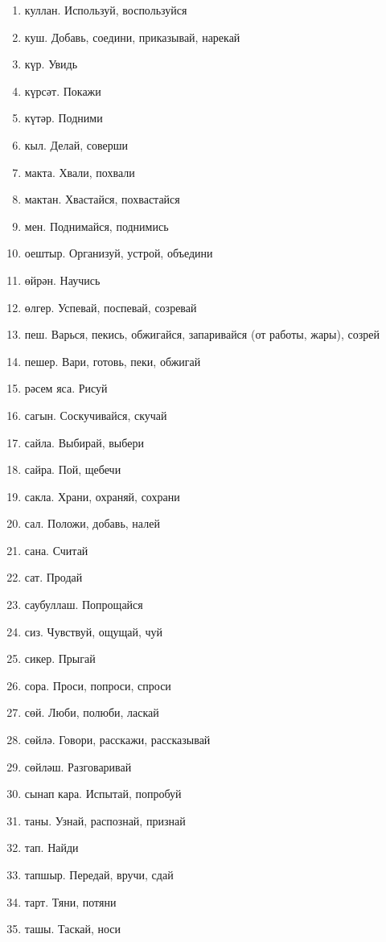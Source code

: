 \documentclass{article}
\begin{document}
\begin{enumerate}
    \item куллан. Используй, воспользуйся
    \item куш. Добавь, соедини, приказывай, нарекай
    \item күр. Увидь
    \item күрсәт. Покажи
    \item күтәр. Подними
    \item кыл. Делай, соверши
    \item макта. Хвали, похвали
    \item мактан. Хвастайся, похвастайся
    \item мен. Поднимайся, поднимись
    \item оештыр. Организуй, устрой, объедини
    \item өйрән. Научись
    \item өлгер. Успевай, поспевай, созревай
    \item пеш. Варься, пекись, обжигайся, запаривайся (от работы, жары), созрей
    \item пешер. Вари, готовь, пеки, обжигай
    \item рәсем яса. Рисуй
    \item сагын. Соскучивайся, скучай
    \item сайла. Выбирай, выбери
    \item сайра. Пой, щебечи
    \item сакла. Храни, охраняй, сохрани
    \item сал. Положи, добавь, налей
    \item сана. Считай
    \item сат. Продай
    \item саубуллаш. Попрощайся
    \item сиз. Чувствуй, ощущай, чуй
    \item сикер. Прыгай
    \item сора. Проси, попроси, спроси
    \item сөй. Люби, полюби, ласкай
    \item сөйлә. Говори, расскажи, рассказывай
    \item сөйләш. Разговаривай
    \item сынап кара. Испытай, попробуй
    \item таны. Узнай, распознай, признай
    \item тап. Найди
    \item тапшыр. Передай, вручи, сдай
    \item тарт. Тяни, потяни
    \item ташы. Таскай, носи

\end{enumerate}
\end{document}
